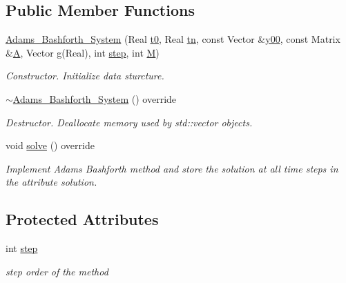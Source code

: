 \subsection*{Public Member Functions}
\begin{DoxyCompactItemize}
\item 
\mbox{\label{class_adams___bashforth___system_a6fabff52bfd4dee448d918ac40efb1ef}} 
\mbox{\hyperlink{class_adams___bashforth___system_a6fabff52bfd4dee448d918ac40efb1ef}{Adams\+\_\+\+Bashforth\+\_\+\+System}} (Real \mbox{\hyperlink{class_o_d_e___system_a1947b357608babc98c5e79d645e24c3c}{t0}}, Real \mbox{\hyperlink{class_o_d_e___system_a5c5a0dd9f04dfb8d8a84d49b741773af}{tn}}, const Vector \&\mbox{\hyperlink{class_o_d_e___system_a1379137a4480e5861fd1911bc061f908}{y00}}, const Matrix \&\mbox{\hyperlink{class_o_d_e___system_a632009677e80b62a1996e842398bf8b6}{A}}, Vector \mbox{\hyperlink{class_o_d_e___system_a2dee2a4b3468547c3ddab15edfc8ddfd}{g}}(Real), int \mbox{\hyperlink{class_adams___bashforth___system_abc285f795f629737fb82c223b896c5e8}{step}}, int \mbox{\hyperlink{class_o_d_e___system_a46e5ee402ffc7c500dccad753a1fba36}{M}})
\begin{DoxyCompactList}\small\item\em Constructor. Initialize data sturcture. \end{DoxyCompactList}\item 
\mbox{\label{class_adams___bashforth___system_af183f3376f969b50d1a09305a5bff62b}} 
\mbox{\hyperlink{class_adams___bashforth___system_af183f3376f969b50d1a09305a5bff62b}{$\sim$\+Adams\+\_\+\+Bashforth\+\_\+\+System}} () override
\begin{DoxyCompactList}\small\item\em Destructor. Deallocate memory used by std\+::vector objects. \end{DoxyCompactList}\item 
void \mbox{\hyperlink{class_adams___bashforth___system_aa34bb9a1367a3b15f606ff49054e9ece}{solve}} () override
\begin{DoxyCompactList}\small\item\em Implement Adams Bashforth method and store the solution at all time steps in the attribute solution. \end{DoxyCompactList}\end{DoxyCompactItemize}
\subsection*{Protected Attributes}
\begin{DoxyCompactItemize}
\item 
\mbox{\label{class_adams___bashforth___system_abc285f795f629737fb82c223b896c5e8}} 
int \mbox{\hyperlink{class_adams___bashforth___system_abc285f795f629737fb82c223b896c5e8}{step}}
\begin{DoxyCompactList}\small\item\em step order of the method \end{DoxyCompactList}\end{DoxyCompactItemize}
